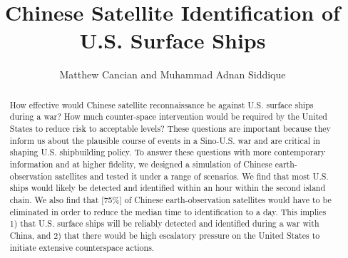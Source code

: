 \documentclass[12pt]{article}
\title{Chinese Satellite Identification of U.S. Surface Ships}
\author{Matthew Cancian and Muhammad Adnan Siddique}
\date{}
\begin{document}
\maketitle

\begin{abstract}
How effective would Chinese satellite reconnaissance be against U.S. surface ships during a war? How much counter-space intervention would be required by the United States to reduce risk to acceptable levels? These questions are important because they inform us about the plausible course of events in a Sino-U.S. war and are critical in shaping U.S. shipbuilding policy. To answer these questions with more contemporary information and at higher fidelity, we designed a simulation of Chinese earth-observation satellites and tested it under a range of scenarios. We find that most U.S. ships would likely be detected and identified within an hour within the second island chain. We also find that [75\%] of Chinese earth-observation satellites would have to be eliminated in order to reduce the median time to identification to a day. This implies 1) that U.S. surface ships will be reliably detected and identified during a war with China, and 2) that there would be high escalatory pressure on the United States to initiate extensive counterspace actions.
\end{abstract}
\end{document}
